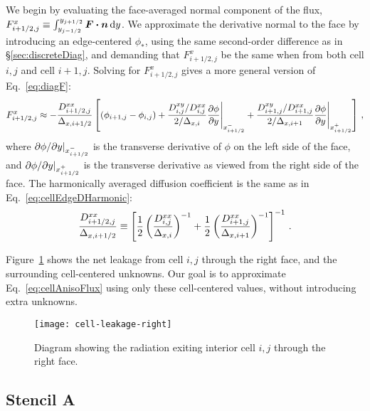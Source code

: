 We begin by evaluating the face-averaged normal component of the flux,
$F_{i+1/2,j}^x \equiv \int_{y_{j-1/2}}^{y_{j+1/2}} \bm{F} \bm{\cdot} \bm{n} \mathop{}\!\mathrm{d}
y$. We approximate the derivative normal
to the face by introducing an edge-centered $\phi_*$, using the same second-order
difference as in \S\ref{sec:discreteDiag}, and demanding that $F_{i+1/2,j}^x$ be
the same when from both cell $i,j$ and cell $i+1,j$.
Solving for $F_{i+1/2,j}^x$ gives a more general version of
Eq.~\eqref{eq:diagF}:
\begin{equation} \label{eq:cellAnisoFlux}
  F_{i+1/2,j}^{x} \approx
  - \frac{D^{xx}_{i+1/2,j}}{\Delta_{x,i+1/2}}
  \left[ 
    \left( \phi_{i+1,j} - \phi_{i,j} \right)
  + \frac{D^{xy}_{i,j}/D^{xx}_{i,j}}{2/\Delta_{x,i}}
    \frac{\partial \phi}{\partial y} \Bigg|_{x_{i+1/2}^-}
  + \frac{D^{xy}_{i+1,j}/D^{xx}_{i+1,j}}{2/\Delta_{x,i+1}}
    \frac{\partial \phi}{\partial y} \Bigg|_{x_{i+1/2}^+}
  \right]\,,
\end{equation}
where ${\partial \phi}/{\partial y} |_{x_{i+1/2}^-}$ is the transverse derivative of
$\phi$ on the left side of the face, and ${\partial \phi}/{\partial y} |_{x_{i+1/2}^+}$ is
the transverse derivative as viewed from the right side of the face.
The harmonically averaged diffusion coefficient is the same as in
Eq.~\eqref{eq:cellEdgeDHarmonic}:
\begin{equation*}
  \frac{D^{xx}_{i+1/2,j}}{\Delta_{x,i+1/2}} \equiv \left[
  \frac12 \left( \frac{D^{xx}_{i,j}}{\Delta_{x,i}} \right)^{-1}
 + \frac12 \left( \frac{D^{xx}_{i+1,j}}{\Delta_{x,i+1}} \right)^{-1}
  \right]^{-1}\,.
\end{equation*}

Figure~\ref{fig:cellAnisoLeakage} shows the net leakage from cell $i,j$ through
the
right face, and the surrounding cell-centered unknowns. Our goal is to
approximate Eq.~\eqref{eq:cellAnisoFlux} using only these cell-centered values,
without introducing extra unknowns.
%
\begin{figure}[htb]
  \centering
  \texttt{[image: cell-leakage-right]}
  \caption{Diagram showing the radiation exiting interior cell $i,j$ through the
  right face.}
  \label{fig:cellAnisoLeakage}
\end{figure}

\subsection{Stencil A}\label{sec:cellAnisoA}

